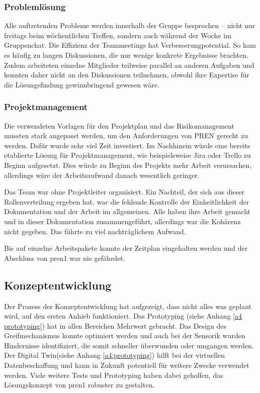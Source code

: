 \documentclass[../main.tex]{subfiles}
\begin{document}
\subsubsection{Problemlösung}
Alle auftretenden Probleme werden innerhalb der Gruppe besprochen – nicht nur freitags beim wöchentlichen Treffen, sondern auch während der Woche im Gruppenchat. Die Effizienz der Teammeetings hat Verbesserungpotential. So kam es häufig zu langen Diskussionen, die nur wenige konkrete Ergebnisse brachten. Zudem arbeiteten einzelne Mitglieder teilweise parallel an anderen Aufgaben und konnten daher nicht an den Diskussionen teilnehmen, obwohl ihre Expertise für die Lösungsfindung gewinnbringend gewesen wäre.

\subsubsection{Projektmanagement}

Die verwendeten Vorlagen für den Projektplan und das Risikomanagement mussten stark angepasst werden, um den Anforderungen von PREN gerecht zu werden. Dafür wurde sehr viel Zeit investiert. Im Nachhinein würde eine bereits etablierte Lösung für Projektmanagement, wie beispielsweise Jira oder Trello zu Beginn aufgesetzt. Dies würde zu Beginn des Projekts mehr Arbeit verursachen, allerdings wäre der Arbeitsaufwand danach wesentlich geringer.

Das Team war ohne Projektleiter organisiert. Ein Nachteil, der sich aus dieser Rollenverteilung ergeben hat, war die fehlende Kontrolle der Einheitlichkeit der Dokumentation und der Arbeit im allgemeinen. Alle haben ihre Arbeit gemacht und in dieser Dokumentation zusammengeführt, allerdings war die Kohärenz nicht gegeben. Das führte zu viel nachträglichem Aufwand.

Bis auf einzelne Arbeitspakete konnte der Zeitplan eingehalten werden und der Abschluss von \acrshort{pren1} war nie gefährdet.

\subsection{Konzeptentwicklung}

Der Prozess der Konzeptentwicklung hat aufgezeigt, dass nicht alles was geplant wird, auf den ersten Anhieb funktioniert. Das Prototyping (siehe Anhang \ref{a4 prototyping}) hat in allen Bereichen Mehrwert gebracht. Das Design des Greifmechanismus konnte optimiert werden und auch bei der Sensorik wurden Hindernisse identifiziert, die somit schneller überwunden oder umgangen werden. Der Digital Twin(siehe Anhang \ref{a4:prototyping}) hilft bei der virtuellen Datenbeschaffung und kann in Zukunft potentiell für weitere Zwecke verwendet werden. Viele weitere Tests und Prototyping haben dabei geholfen, das Lösungskonzept von \acrshort{pren1} robuster zu gestalten.
\end{document}
